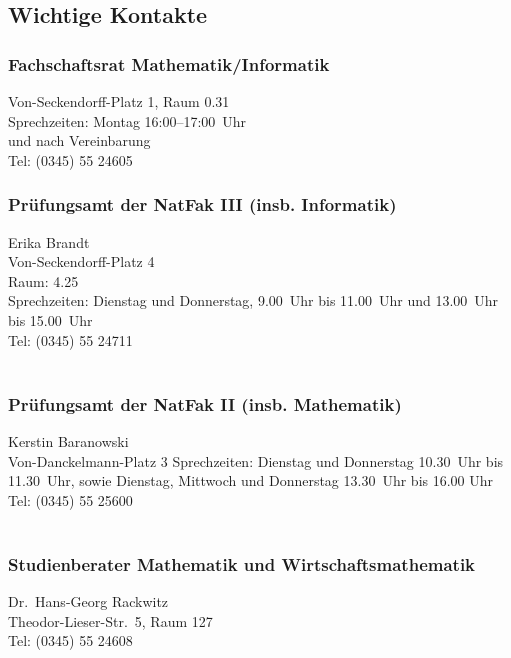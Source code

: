 \subsection{Wichtige Kontakte}

\subsubsection{Fachschaftsrat Mathematik/Informatik}
Von-Seckendorff-Platz 1, Raum 0.31\\
Sprechzeiten: Montag 16:00--17:00~Uhr\\ und nach Vereinbarung \\
Tel: (0345) 55 24605\\

\subsubsection{Prüfungsamt der NatFak III (insb. Informatik)}
Erika Brandt\\
Von-Seckendorff-Platz 4\\
Raum: 4.25\\
Sprechzeiten: Dienstag und Donnerstag, 9.00~Uhr bis 11.00~Uhr und
13.00~Uhr bis 15.00~Uhr\\
Tel: (0345) 55 24711\\
\\

\subsubsection{Prüfungsamt der NatFak II (insb. Mathematik)}
Kerstin Baranowski\\
Von-Danckelmann-Platz 3
Sprechzeiten: Dienstag und Donnerstag 10.30~Uhr bis 11.30~Uhr, sowie
Dienstag, Mittwoch und Donnerstag 13.30~Uhr bis 16.00 Uhr\\
Tel: (0345) 55 25600\\
\\

\subsubsection{Studienberater Mathematik und Wirtschaftsmathematik}
Dr.\ Hans-Georg Rackwitz\\
Theodor-Lieser-Str.\ 5, Raum 127\\
Tel: (0345) 55 24608\\
\\

